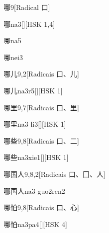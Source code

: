 \begin{entry}{哪}{9}[Radical ⼝]
  \begin{phonetics}{哪}{na3}[][HSK 1,4]
  \end{phonetics}
  \begin{phonetics}{哪}{na5}
  \end{phonetics}
  \begin{phonetics}{哪}{nei3}
  \end{phonetics}
\end{entry}

\begin{entry}{哪儿}{9,2}[Radicais ⼝、⼉]
  \begin{phonetics}{哪儿}{na3r5}[][HSK 1]
  \end{phonetics}
\end{entry}

\begin{entry}{哪里}{9,7}[Radicais ⼝、⾥]
  \begin{phonetics}{哪里}{na3 li3}[][HSK 1]
  \end{phonetics}
\end{entry}

\begin{entry}{哪些}{9,8}[Radicais ⼝、⼆]
  \begin{phonetics}{哪些}{na3xie1}[][HSK 1]
  \end{phonetics}
\end{entry}

\begin{entry}{哪国人}{9,8,2}[Radicais ⼝、⼞、⼈]
  \begin{phonetics}{哪国人}{na3 guo2ren2}
  \end{phonetics}
\end{entry}

\begin{entry}{哪怕}{9,8}[Radicais ⼝、⼼]
  \begin{phonetics}{哪怕}{na3pa4}[][HSK 4]
  \end{phonetics}
\end{entry}

